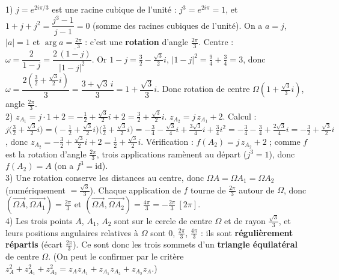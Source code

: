 1) $j=e^{2i\pi/3}$ est une racine cubique de l'unité : $j^3=e^{2i\pi}=1$, et
$1+j+j^2=\dfrac{j^3-1}{j-1}=0$ (somme des racines cubiques de l'unité). On a $a=j$, $|a|=1$ et
$\arg a=\frac{2\pi}3$ : c'est une \textbf{rotation} d'angle $\frac{2\pi}3$. Centre :
$\omega=\dfrac{2}{1-j}=\dfrac{2\,\overline{(1-j)}}{|1-j|^2}$. Or $1-j=\frac32-\frac{\sqrt3}2 i$,
$|1-j|^2=\frac94+\frac34=3$, donc $\omega=\dfrac{2(\frac32+\frac{\sqrt3}2 i)}{3}=\dfrac{3+\sqrt3\,i}3
=1+\dfrac{\sqrt3}3 i$. Donc rotation de centre $\Omega\!\left(1+\frac{\sqrt3}3 i\right)$, angle $\frac{2\pi}3$.\\
2) $z_{A_1}=j\cdot1+2=-\frac12+\frac{\sqrt3}2 i+2=\frac32+\frac{\sqrt3}2 i$.\;
$z_{A_2}=j\,z_{A_1}+2$. Calcul : $j\big(\frac32+\frac{\sqrt3}2 i\big)
=\big(-\frac12+\frac{\sqrt3}2 i\big)\big(\frac32+\frac{\sqrt3}2 i\big)
=-\frac34-\frac{\sqrt3}4 i+\frac{3\sqrt3}4 i+\frac{3}4 i^2=-\frac34-\frac34+\frac{2\sqrt3}4 i
=-\frac32+\frac{\sqrt3}2 i$, donc $z_{A_2}=-\frac32+\frac{\sqrt3}2 i+2=\frac12+\frac{\sqrt3}2 i$.\;
Vérification : $f(A_2)=j\,z_{A_2}+2$ ; comme $f$ est la rotation d'angle $\frac{2\pi}3$, trois
applications ramènent au départ ($j^3=1$), donc $f(A_2)=A$ (on a $f^3=\mathrm{id}$).\\
3) Une rotation conserve les distances au centre, donc $\Omega A=\Omega A_1=\Omega A_2$
(numériquement $=\frac{\sqrt3}3$). Chaque application de $f$ tourne de $\frac{2\pi}3$ autour de
$\Omega$, donc $(\overrightarrow{\Omega A},\overrightarrow{\Omega A_1})=\frac{2\pi}3$ et
$(\overrightarrow{\Omega A},\overrightarrow{\Omega A_2})=\frac{4\pi}3=-\frac{2\pi}3\ [2\pi]$.\\
4) Les trois points $A$, $A_1$, $A_2$ sont sur le cercle de centre $\Omega$ et de rayon
$\frac{\sqrt3}3$, et leurs positions angulaires relatives à $\Omega$ sont $0$, $\frac{2\pi}3$,
$\frac{4\pi}3$ : ils sont \textbf{régulièrement répartis} (écart $\frac{2\pi}3$). Ce sont donc les
trois sommets d'un \textbf{triangle équilatéral} de centre $\Omega$. (On peut le confirmer par le
critère $z_A^2+z_{A_1}^2+z_{A_2}^2=z_Az_{A_1}+z_{A_1}z_{A_2}+z_{A_2}z_A$.)
